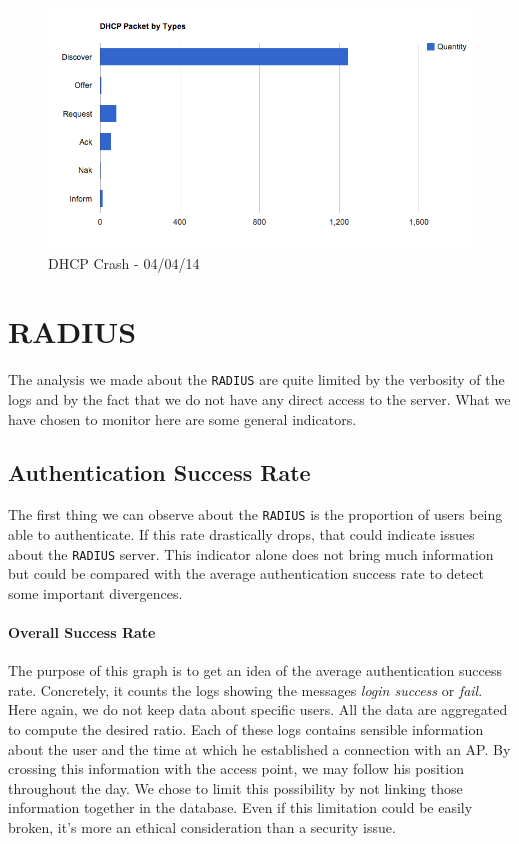 \begin{figure}[H]
	\centering
   \includegraphics[width=1\textwidth]{Pictures/chapter5/dhcpCrash.png}
   \caption{DHCP Crash - 04/04/14}
\end{figure}

\section{RADIUS}
The analysis we made about the \texttt{RADIUS} are quite limited by the verbosity of the logs and by the fact that we do not have any direct access to the server. What we have chosen to monitor here are some general indicators.

\subsection{Authentication Success Rate}
The first thing we can observe about the \texttt{RADIUS} is the proportion of users being able to authenticate. If this rate drastically drops, that could indicate issues about the \texttt{RADIUS} server. This indicator alone does not bring much information but could be compared with the average authentication success rate to detect some important divergences.

\paragraph*{Overall Success Rate} The purpose of this graph is to get an idea of the average authentication success rate. Concretely, it counts the logs showing the messages \textit{login success} or \textit{fail}. Here again, we do not keep data about specific users. All the data are aggregated to compute the desired ratio. Each of these logs contains sensible information about the user and the time at which he established a connection with an AP. By crossing this information with the access point, we may follow his position throughout the day. We chose to limit this possibility by not linking those information together in the database. Even if this limitation could be easily broken, it's more an ethical consideration than a security issue.

